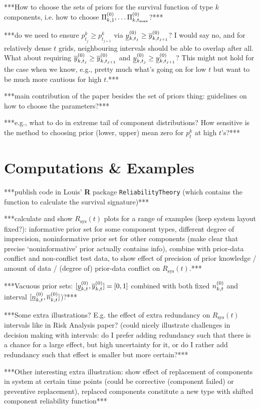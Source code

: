 \documentclass[authoryear, 12pt, a4paper]{elsarticle}
\newcommand{\Rsys}{R_\text{sys}}
\def\tmax{t_\text{max}}
\begin{document}
***How to choose the sets of priors for the survival function of type $k$ components,
i.e. how to choose $\PkZi{1}, \ldots \PkZi{\tmax}$?***

***do we need to ensure $p^k_{t_j} \ge p^k_{t_{j+1}}$ via $\underline{y}^{(0)}_{k,t_j} \ge \overline{y}^{(0)}_{k,t_{j+1}}$?
I would say no, and for relatively dense $t$ grids, neighbouring intervals should be able to overlap after all.
What about requiring $\overline{y}^{(0)}_{k,t_j} \ge \overline{y}^{(0)}_{k,t_{j+1}}$ and $\underline{y}^{(0)}_{k,t_j} \ge \underline{y}^{(0)}_{k,t_{j+1}}$?
This might not hold for the case when we know, e.g., pretty much what's going on for low $t$
but want to be much more cautious for high $t$.***

***main contribution of the paper besides the set of priors thing:
guidelines on how to choose the parameters?***

***e.g., what to do in extreme tail of component distributions?
How sensitive is the method to choosing prior (lower, upper) mean zero for $p^k_t$ at high $t$'s?***


\section{Computations \& Examples}

***publish code in Louis' \textbf{R} package \texttt{ReliabilityTheory}
(which contains the function to calculate the survival signature)***


***calculate and show $\Rsys(t)$ plots for a range of examples (keep system layout fixed?):
informative prior set for some component types, different degree of imprecision,
noninformative prior set for other components (make clear that precise `noninformative' prior actually contains info), 
combine with prior-data conflict and non-conflict test data,
to show effect of precision of prior knowledge / amount of data / (degree of) prior-data conflict on $\Rsys(t)$.***

***Vacuous prior sets: $[\underline{y}^{(0)}_{k,t}, \overline{y}^{(0)}_{k,t}] = [0,1]$ combined with both fixed $n^{(0)}_{k,t}$ and interval $[\underline{n}^{(0)}_{k,t}, \overline{n}^{(0)}_{k,t}]$)?***

***Some extra illustrations? E.g. the effect of extra redundancy on $\Rsys(t)$ intervals like in Risk Analysis paper?
(could nicely illustrate challenges in decision making with intervals:
do I prefer adding redundancy such that there is a chance for a large effect, but high uncertainty for it,
or do I rather add redundancy such that effect is smaller but more certain?***

***Other interesting extra illustration:
show effect of replacement of components in system at certain time points
(could be corrective (component failed) or preventive replacement),
replaced components constitute a new type with shifted component reliability function***
\end{document}
